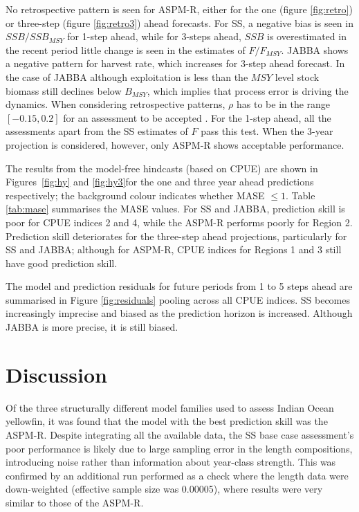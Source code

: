 \documentclass[11pt,a4paper]{article}
\begin{document}
{No retrospective pattern is seen for ASPM-R, either for the one (figure \ref{fig:retro}) or three-step (figure \ref{fig:retro3}) ahead forecasts. For SS, a negative bias is seen in $SSB/SSB_{MSY}$ for 1-step ahead, while for 3-steps ahead, $SSB$ is overestimated in the recent period little change is seen in the estimates of $F/F_{MSY}$. JABBA shows a negative pattern for harvest rate, which increases for 3-step ahead forecast. In the case of JABBA although exploitation is less than the ${MSY}$ level stock biomass still declines below $B_{MSY}$, which implies that process error is driving the dynamics. When considering retrospective patterns, $\rho$ has to be in the range $[-0.15,0.2]$ for an assessment to be accepted \citep{ICES2019}. For the 1-step ahead, all the assessments apart from the SS estimates of $F$ pass this test. When the 3-year projection is considered, however, only ASPM-R shows acceptable performance. 

The results from the model-free hindcasts (based on CPUE) are shown in Figures~\ref{fig:hy} and \ref{fig:hy3}for the one and three year ahead predictions respectively; the background colour indicates whether MASE $\le 1$. Table \ref{tab:mase} summarises the MASE values. For SS and JABBA, prediction skill is poor for CPUE indices 2 and 4, while the ASPM-R performs poorly for Region 2. Prediction skill deteriorates for the three-step ahead projections, particularly for SS and JABBA; although for ASPM-R, CPUE indices for Regions 1 and 3 still have good prediction skill. 

The model and prediction residuals for future periods from 1 to 5 steps ahead are summarised in Figure  \ref{fig:residuals} pooling across all CPUE indices. SS becomes increasingly imprecise and biased as the prediction horizon is increased. Although JABBA is more precise, it is still biased.

\section{Discussion}

Of the three structurally different model families used to assess Indian Ocean yellowfin, it was found that the model with the best prediction skill was the ASPM-R. Despite integrating all the available data, the SS base case assessment's poor performance is likely due to large sampling error in the length compositions, introducing noise rather than information about year-class strength. This was confirmed by an additional run performed as a check where the length data were down-weighted (effective sample size was  0.00005), where results were very similar to those of the ASPM-R. 

}
\end{document}
